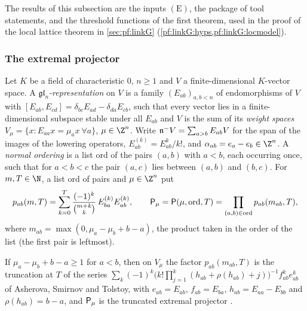 The results of this subsection are the inputs $(\mathrm E)$, the package of tool statements, and the threshold functions
of the first theorem, used in the proof of the local lattice theorem in \cref{sec:pf:linkG}
(\cref{pf:linkG:hyps,pf:linkG:locmodel}).

\subsubsection{The extremal projector}

\begin{definition}\label{pf:sh-curv:epdef}
Let $K$ be a field of characteristic $0$, $n\ge1$ and $V$ a finite-dimensional $K$-vector space. A
\emph{$\mathfrak{gl}_n$-representation} on $V$ is a family $(E_{ab})_{a,b<n}$ of endomorphisms of $V$ with
$[E_{ab},E_{cd}]=\delta_{bc}E_{ad}-\delta_{da}E_{cb}$, such that every vector lies in a finite-dimensional subspace
stable under all $E_{ab}$ and $V$ is the sum of its \emph{weight spaces}
$V_\mu=\{x:E_{aa}x=\mu_ax\ \forall a\}$, $\mu\in\Z^n$. Write $\mathfrak n^- V=\sum_{a>b}E_{ab}V$ for the span of the images of
the lowering operators, $E^{(k)}_{ab}=E_{ab}^k/k!$, and $\alpha_{ab}=e_a-e_b\in\Z^n$. A \emph{normal ordering} is a list
$\mathrm{ord}$ of the pairs $(a,b)$ with $a<b$, each occurring once, such that for $a<b<c$ the pair $(a,c)$ lies between
$(a,b)$ and $(b,c)$. For $m,T\in\N$, a list $\mathrm{ord}$ of pairs and $\mu\in\Z^n$ put
\begin{equation}\label{eq:pf:sh-curv:pfac}
p_{ab}(m,T)=\sum_{k=0}^T\frac{(-1)^k}{\binom{m+k}{k}}\,E^{(k)}_{ba}E^{(k)}_{ab},\qquad
\mathsf P_\mu=\mathsf P(\mu,\mathrm{ord},T)=\prod_{(a,b)\in\mathrm{ord}}p_{ab}(m_{ab},T),
\end{equation}
where $m_{ab}=\max(0,\mu_a-\mu_b+b-a)$, the product taken in the order of the list (the first pair is leftmost).
\end{definition}

If $\mu_a-\mu_b+b-a\ge1$ for $a<b$, then on $V_\mu$ the factor $p_{ab}(m_{ab},T)$ is the truncation at $T$ of the series
$\sum_k(-1)^k\bigl(k!\prod_{j=1}^k(h_{ab}+\rho(h_{ab})+j)\bigr)^{-1}f^k_{ab}e^k_{ab}$ of Asherova, Smirnov and Tolstoy, with
$e_{ab}=E_{ab}$, $f_{ab}=E_{ba}$, $h_{ab}=E_{aa}-E_{bb}$ and $\rho(h_{ab})=b-a$, and $\mathsf P_\mu$ is the truncated
extremal projector \cite{AsherovaSmirnovTolstoy1971,Zhelobenko1989}.

